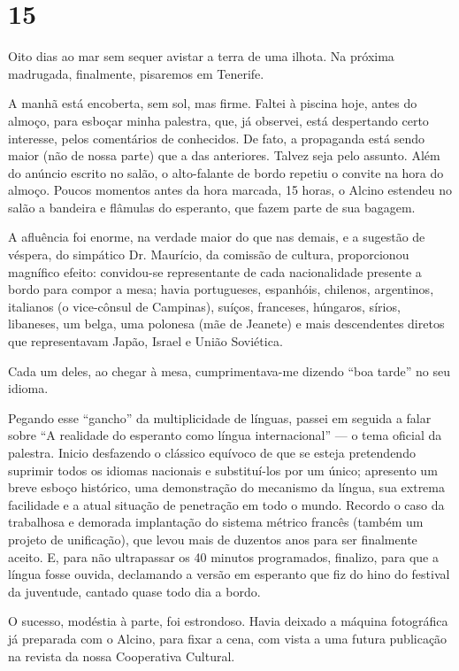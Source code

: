 \section*{15 \adfflatleafright {}}

Oito dias ao mar sem sequer avistar a terra de uma ilhota. Na próxima madrugada, finalmente, pisaremos em Tenerife.

A manhã está encoberta, sem sol, mas firme. Faltei à piscina hoje, antes do almoço, para esboçar minha palestra, que, já observei, está despertando certo interesse, pelos comentários de conhecidos. De fato, a propaganda está sendo maior (não de nossa parte) que a das anteriores. Talvez seja pelo assunto. Além do anúncio escrito no salão, o alto-falante de bordo repetiu o convite na hora do almoço. Poucos momentos antes da hora marcada, 15 horas, o Alcino estendeu no salão a bandeira e flâmulas do esperanto, que fazem parte de sua bagagem.

A afluência foi enorme, na verdade maior do que nas demais, e a sugestão de véspera, do simpático Dr. Maurício, da comissão de cultura, proporcionou magnífico efeito: convidou-se representante de cada nacionalidade presente a bordo para compor a mesa; havia portugueses, espanhóis, chilenos, argentinos, italianos (o vice-cônsul de Campinas), suíços, franceses, húngaros, sírios, libaneses, um belga, uma polonesa (mãe de Jeanete) e mais descendentes diretos que representavam Japão, Israel e União Soviética.

Cada um deles, ao chegar à mesa, cumprimentava-me dizendo ``boa tarde'' no seu idioma.

Pegando esse ``gancho'' da multiplicidade de línguas, passei em seguida a falar sobre ``A realidade do esperanto como língua internacional'' --- o tema oficial da palestra. Inicio desfazendo o clássico equívoco de que se esteja pretendendo suprimir todos os idiomas nacionais e substituí-los por um único; apresento um breve esboço histórico, uma demonstração do mecanismo da língua, sua extrema facilidade e a atual situação de penetração em todo o mundo. Recordo o caso da trabalhosa e demorada implantação do sistema métrico francês (também um projeto de unificação), que levou mais de duzentos anos para ser finalmente aceito. E, para não ultrapassar os 40 minutos programados, finalizo, para que a língua fosse ouvida, declamando a versão em esperanto que fiz do hino do festival da juventude, cantado quase todo dia a bordo.

O sucesso, modéstia à parte, foi estrondoso. Havia deixado a máquina fotográfica já preparada com o Alcino, para fixar a cena, com vista a uma futura publicação na revista da nossa Cooperativa Cultural.


